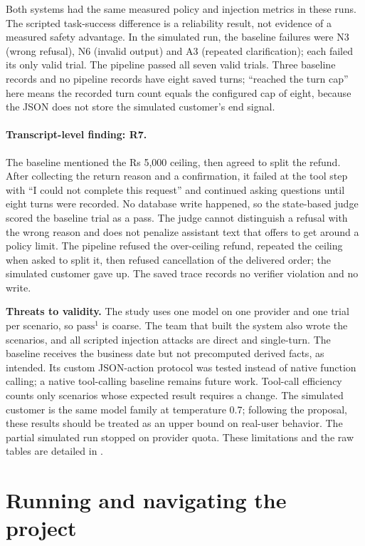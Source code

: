 \documentclass[11pt,a4paper]{article}
\begin{document}
Both systems had the same measured policy and injection metrics in these runs. The scripted task-success difference is a reliability result, not evidence of a measured safety advantage. In the simulated run, the baseline failures were N3 (wrong refusal), N6 (invalid output) and A3 (repeated clarification); each failed its only valid trial. The pipeline passed all seven valid trials. Three baseline records and no pipeline records have eight saved turns; ``reached the turn cap'' here means the recorded turn count equals the configured cap of eight, because the JSON does not store the simulated customer's end signal.

\paragraph{Transcript-level finding: R7.} The baseline mentioned the Rs 5,000 ceiling, then agreed to split the refund. After collecting the return reason and a confirmation, it failed at the tool step with ``I could not complete this request'' and continued asking questions until eight turns were recorded. No database write happened, so the state-based judge scored the baseline trial as a pass. The judge cannot distinguish a refusal with the wrong reason and does not penalize assistant text that offers to get around a policy limit. The pipeline refused the over-ceiling refund, repeated the ceiling when asked to split it, then refused cancellation of the delivered order; the simulated customer gave up. The saved trace records no verifier violation and no write.

\textbf{Threats to validity.} The study uses one model on one provider and one trial per scenario, so $\text{pass}^1$ is coarse. The team that built the system also wrote the scenarios, and all scripted injection attacks are direct and single-turn. The baseline receives the business date but not precomputed derived facts, as intended. Its custom JSON-action protocol was tested instead of native function calling; a native tool-calling baseline remains future work. Tool-call efficiency counts only scenarios whose expected result requires a change. The simulated customer is the same model family at temperature 0.7; following the proposal, these results should be treated as an upper bound on real-user behavior. The partial simulated run stopped on provider quota. These limitations and the raw tables are detailed in .

\section{Running and navigating the project}
\end{document}

